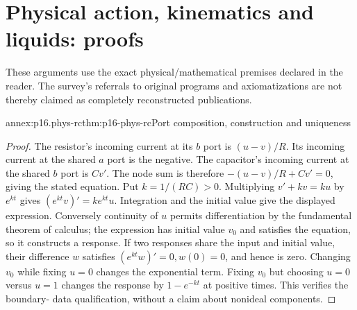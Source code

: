 \section{Physical action, kinematics and liquids: proofs}
\label{sec:annex-p16-kr2008-action-and-causation}

These arguments use the exact physical/mathematical premises declared in
the reader. The survey's referrals to original programs and axiomatizations
are not thereby claimed as completely reconstructed publications.

\begin{annexitem}{annex:p16.phys-rc}{thm:p16-phys-rc}{Port composition, construction and uniqueness}
\begin{proof}
The resistor's incoming current at its \(b\) port is \((u-v)/R\).
Its incoming current at the shared \(a\) port is the negative. The
capacitor's incoming current at the shared \(b\) port is \(Cv'\).
The node sum is therefore \(-(u-v)/R+Cv'=0\), giving the stated equation.
Put \(k=1/(RC)>0\). Multiplying \(v'+kv=ku\) by \(e^{kt}\)
gives \((e^{kt}v)'=ke^{kt}u\). Integration and the initial value give
the displayed expression. Conversely continuity of \(u\) permits
differentiation by the fundamental theorem of calculus; the expression
has initial value \(v_0\) and satisfies the equation, so it constructs
a response. If two responses share the input and initial value, their
difference \(w\) satisfies \((e^{kt}w)'=0,w(0)=0\), and hence is zero.
Changing \(v_0\) while fixing \(u=0\) changes the exponential term.
Fixing \(v_0\) but choosing \(u=0\) versus \(u=1\) changes the
response by \(1-e^{-kt}\) at positive times. This verifies the boundary-
data qualification, without a claim about nonideal components.
\end{proof}
\end{annexitem}

